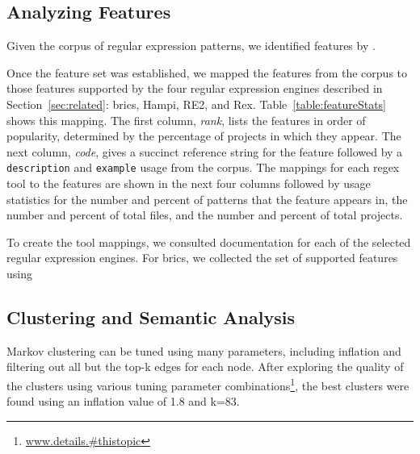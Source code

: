 \subsection{Analyzing Features}
\label{study:features}
Given the corpus of regular expression patterns, we identified features by . 

Once the feature set was established, we mapped the features from the corpus to those features supported by the four regular expression engines described in Section~\ref{sec:related}: brics, Hampi, RE2, and Rex. 
Table~\ref{table:featureStats} shows this mapping. 
The first column, \emph{rank}, lists the features in order of popularity, determined by the percentage of projects in which they appear. The next column, \emph{code}, gives a succinct reference string for the feature followed by a {\tt description} and {\tt example} usage from the corpus. The mappings for each regex tool to the features are shown in the next four columns followed by usage statistics for the number and percent of patterns that the feature appears in, the number and percent of total files, and the number and percent of total projects. 

To create the tool mappings, we consulted documentation for each of the selected regular expression engines. For brics, we collected the set of supported features using  


\subsection{Clustering and Semantic Analysis}
Markov clustering can be tuned using many parameters, including inflation and filtering out all but the top-k edges for each node.  After exploring the quality of the clusters using various tuning parameter combinations\footnote{\url{www.details.#thistopic}}, the best clusters were found using an inflation value of 1.8 and k=83.


